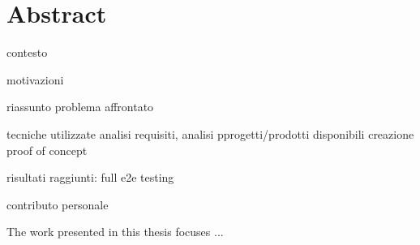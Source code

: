 \chapter*{Abstract} %
\label{abtract}


contesto 

motivazioni

riassunto problema affrontato

tecniche utilizzate
analisi requisiti, 
analisi pprogetti/prodotti disponibili
creazione proof of concept


risultati raggiunti:
full e2e testing

contributo personale



The work presented in this thesis focuses
...

\newpage
